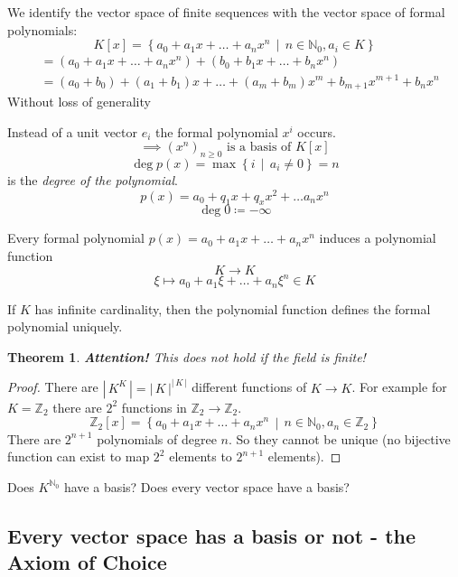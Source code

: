 \documentclass[a4paper,landscape,twocolumn]{article}
\newcommand\setdef[2]{\left\{#1\,\middle|\,#2\right\}}
\newcommand\card[1]{\left|\,#1\,\right|}
\newtheorem{theorem}{Theorem}[section]
\begin{document}
We identify the vector space of finite sequences with the vector space of formal polynomials:
\[ K[x] = \setdef{a_0 + a_1 x + \ldots + a_n x^n}{n \in \mathbb N_0, a_i \in K} \]
\begin{align*}
    &= (a_0 + a_1 x + \ldots + a_n x^n) + (b_0 + b_1 x + \ldots + b_n x^n) \\
    &= (a_0 + b_0) + (a_1 + b_1)x + \ldots + (a_m + b_m)x^m + b_{m+1} x^{m+1} + b_n x^n
\end{align*}
Without loss of generality

Instead of a unit vector $e_i$ the formal polynomial $x^i$ occurs.
\[ \implies (x^n)_{n \geq 0} \text{ is a basis of } K[x] \]
\[ \deg{p(x)} = \max\setdef{i}{a_i \neq 0} = n \]
is the \emph{degree of the polynomial}.
\[ p(x) = a_0 + q_1 x + q_x x^2 + \ldots a_n x^n \]
\[ \deg{0} \coloneqq -\infty \]

Every formal polynomial $p(x) = a_0 + a_1 x + \ldots + a_n x^n$ induces a polynomial function
\[ K \rightarrow K \]
\[ \xi \mapsto a_0 + a_1 \xi + \ldots + a_n \xi^n \in K \]

If $K$ has infinite cardinality, then the polynomial function defines the formal polynomial uniquely.

\begin{theorem}
  \textbf{Attention!} This does not hold if the field is finite!
\end{theorem}
\begin{proof}
  There are $\card{K^K} = \card{K}^{\card{K}}$ different functions of $K \rightarrow K$.
  For example for $K = \mathbb Z_2$ there are $2^2$ functions in $\mathbb Z_2 \rightarrow \mathbb Z_2$.
  \[ \mathbb Z_2[x] = \setdef{a_0 + a_1 x + \ldots + a_n x^n}{n \in \mathbb N_0, a_n \in \mathbb Z_2} \]
  There are $2^{n+1}$ polynomials of degree $n$. So they cannot be unique (no bijective function can exist
  to map $2^2$ elements to $2^{n+1}$ elements).
\end{proof}

Does $K^{\mathbb N_0}$ have a basis?
Does every vector space have a basis?

\subsection{Every vector space has a basis or not - the Axiom of Choice}
\end{document}
